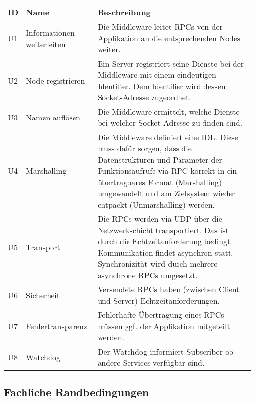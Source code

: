 \begin{tabular}{|p{1.5cm}|p{4cm}|p{8.5cm}|}
	\hline
	\textbf{ID} & \textbf{Name} & \textbf{Beschreibung} \\
	\hline
	U1 & Informationen weiterleiten & Die Middleware leitet RPCs von der Applikation an die entsprechenden Nodes weiter. \\
	\hline
	U2 & Node registrieren & Ein Server registriert seine Dienste bei der Middleware mit einem eindeutigen Identifier. Dem Identifier wird dessen Socket-Adresse zugeordnet. \\
	\hline
	U3 & Namen auflösen & Die Middleware ermittelt, welche Dienste bei welcher Socket-Adresse zu finden sind.\\
	\hline
	U4 & Marshalling & Die Middleware definiert eine IDL. Diese muss dafür sorgen, dass die Datenstrukturen und Parameter der Funktionsaufrufe via RPC korrekt in ein übertragbares Format (Marshalling) umgewandelt und am Zielsystem wieder entpackt (Unmarshalling) werden. \\
	\hline
	U5 & Transport & Die RPCs werden via UDP über die Netzwerkschicht transportiert. Das ist durch die Echtzeitanforderung bedingt. Kommunikation findet asynchron statt. Synchronizität wird durch mehrere asynchrone RPCs umgesetzt.\\
	\hline 
	U6 & Sicherheit & Versendete RPCs haben (zwischen Client und Server) Echtzeitanforderungen. \\
	\hline
	U7 & Fehlertransparenz & Fehlerhafte Übertragung eines RPCs müssen ggf. der Applikation mitgeteilt werden. \\
	\hline
	U8 & Watchdog & Der Watchdog informiert Subscriber ob andere Services verfügbar sind.\\      %
	\hline
	
\end{tabular}

\subsection{Fachliche Randbedingungen}


